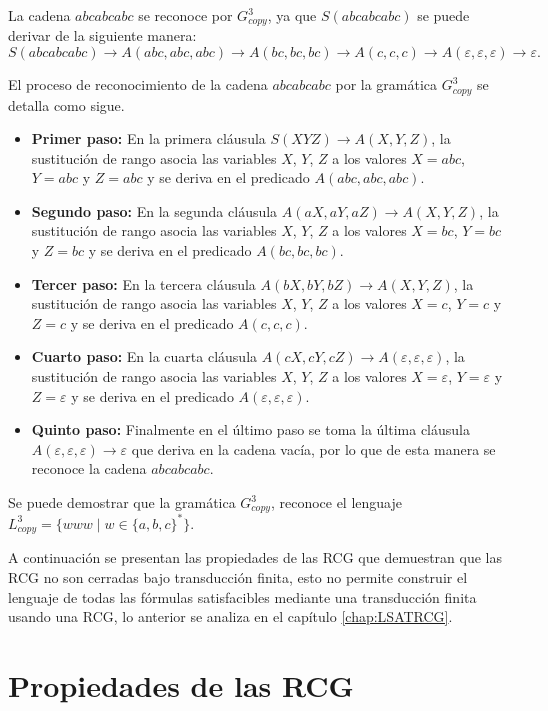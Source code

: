 La cadena $abcabcabc$ se reconoce por $G^3_{copy}$, ya que $S(abcabcabc)$ se puede derivar de la siguiente manera:
$$S(abcabcabc)\to A(abc,abc,abc)\to A(bc,bc,bc)\to A(c,c,c)\to A(\varepsilon,\varepsilon,\varepsilon)\to \varepsilon.$$

El proceso de reconocimiento de la cadena $abcabcabc$ por la gramática $G^3_{copy}$ se detalla como sigue.

\begin{itemize}
    \item \textbf{Primer paso:} En la primera cláusula $S(XYZ)\to A(X,Y,Z)$, la sustitución de rango asocia las
          variables $X$, $Y$, $Z$ a los valores $X=abc$, $Y=abc$ y $Z=abc$ y se deriva en el predicado $A(abc,abc,abc)$.
    \item \textbf{Segundo paso:} En la segunda cláusula $A(aX,aY,aZ)\to A(X,Y,Z)$, la sustitución de rango asocia las
          variables $X$, $Y$, $Z$ a los valores $X=bc$, $Y=bc$ y $Z=bc$ y se deriva en el predicado $A(bc,bc,bc)$.
    \item \textbf{Tercer paso:} En la tercera cláusula $A(bX,bY,bZ)\to A(X,Y,Z)$, la sustitución de rango asocia las
          variables $X$, $Y$, $Z$ a los valores $X=c$, $Y=c$ y $Z=c$ y se deriva en el predicado $A(c,c,c)$.
    \item \textbf{Cuarto paso:} En la cuarta cláusula $A(cX,cY,cZ)\to A(\varepsilon,\varepsilon,\varepsilon)$, la sustitución de rango asocia las
          variables $X$, $Y$, $Z$ a los valores $X=\varepsilon$, $Y=\varepsilon$ y $Z=\varepsilon$ y se deriva en el predicado $A(\varepsilon,\varepsilon,\varepsilon)$.
    \item \textbf{Quinto paso:} Finalmente en el último paso se toma la última
          cláusula $A(\varepsilon,\varepsilon,\varepsilon)\to \varepsilon$ que deriva en la cadena vacía, por lo que de esta manera se reconoce la cadena $abcabcabc$.
\end{itemize}

Se puede demostrar que la gramática $G^3_{copy}$, reconoce el lenguaje $L_{copy}^3=\{www\mid w\in \{a,b,c\}^*\}$.

A continuación se presentan las propiedades de las RCG que demuestran
que las RCG no son cerradas bajo transducción finita, esto no permite construir el lenguaje de todas las fórmulas
satisfacibles mediante una transducción finita usando una RCG, lo anterior se analiza en el capítulo \ref{chap:LSATRCG}.

\section{Propiedades de las RCG}

